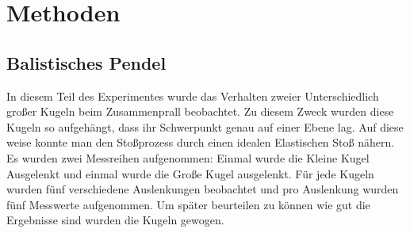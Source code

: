 \section{Methoden}
\subsection*{Balistisches Pendel}
In diesem Teil des Experimentes wurde das Verhalten zweier Unterschiedlich großer Kugeln beim Zusammenprall beobachtet.
Zu diesem Zweck wurden diese Kugeln so aufgehängt, dass ihr Schwerpunkt genau auf einer Ebene lag.
Auf diese weise konnte man den Stoßprozess durch einen idealen Elastischen Stoß nähern.
Es wurden zwei Messreihen aufgenommen: Einmal wurde die Kleine Kugel Ausgelenkt und einmal wurde die Große Kugel ausgelenkt.
Für jede Kugeln wurden fünf verschiedene Auslenkungen beobachtet und pro Auslenkung wurden fünf Messwerte aufgenommen.
Um später beurteilen zu können wie gut die Ergebnisse sind wurden die Kugeln gewogen.

